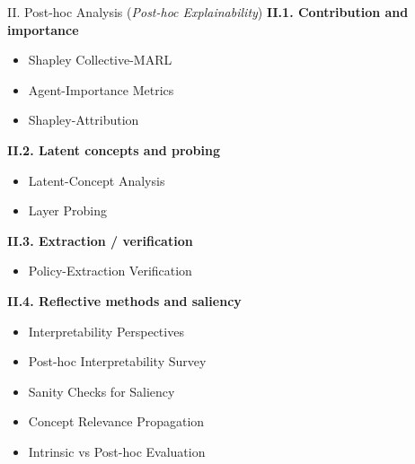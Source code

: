 \begin{frame}{II. Post-hoc Analysis (\textit{Post-hoc Explainability})}
    \small
    \textbf{II.1. Contribution and importance}
    \begin{itemize}
        \item Shapley Collective-MARL~\cite{heuillet2021collective}
        \item Agent-Importance Metrics~\cite{khlifi2023agentimportance}
        \item Shapley-Attribution~\cite{li2025from}
    \end{itemize}

    \vspace{2mm}
    \textbf{II.2. Latent concepts and probing}
    \begin{itemize}
        \item Latent-Concept Analysis~\cite{grupen2022concept}
        \item Layer Probing~\cite{alain2018understanding}
    \end{itemize}

    \vspace{2mm}
    \textbf{II.3. Extraction / verification}
    \begin{itemize}
        \item Policy-Extraction Verification~\cite{bastani2018verifiable}
    \end{itemize}

    \vspace{2mm}
    \textbf{II.4. Reflective methods and saliency}
    \begin{itemize}
        \item Interpretability Perspectives~\cite{poupart2025perspectives}
        \item Post-hoc Interpretability Survey~\cite{madsen2023posthoc}
        \item Sanity Checks for Saliency~\cite{adebayo2018sanity}
        \item Concept Relevance Propagation~\cite{achtibat2022from}
        \item Intrinsic vs Post-hoc Evaluation~\cite{amorim2023evaluating}
    \end{itemize}
\end{frame}


